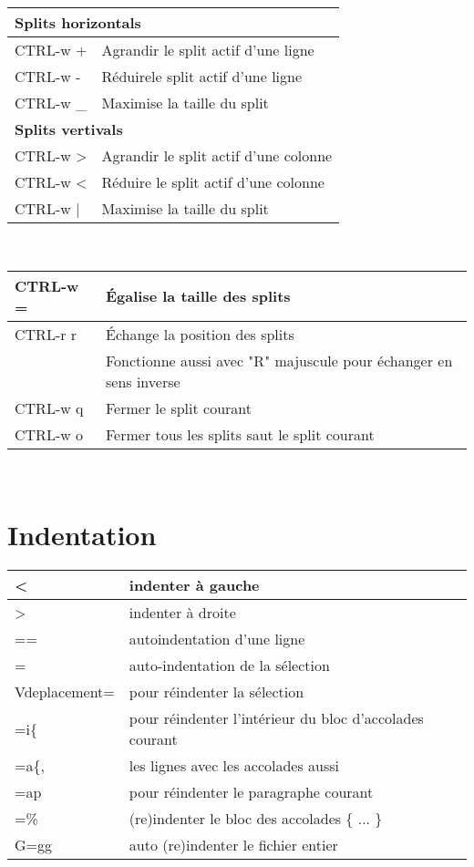 \documentclass{article}
\begin{document}
\begin{tabular}{|p{3cm}| l| }\hline
\multicolumn{2}{|l|}{\textbf{Splits horizontals}} \\ \hline
    CTRL-w + & Agrandir le split actif d'une ligne\\ \hline
    CTRL-w - & Réduirele split actif d'une ligne\\ \hline
    CTRL-w \_ & Maximise la taille du split\\ \hline
\multicolumn{2}{|l|}{\textbf{Splits vertivals}}\\ \hline
    CTRL-w > & Agrandir le split actif d'une colonne \\ \hline
    CTRL-w < & Réduire le split actif d'une colonne \\ \hline
    CTRL-w | & Maximise la taille du split\\ \hline
\end{tabular}\\[1.5em]


\begin{tabular}{|p{3cm}| l| }\hline
    CTRL-w = & Égalise la taille des splits \\ \hline
    CTRL-r r & Échange la position des splits\\
    & Fonctionne aussi avec "R" majuscule pour échanger en sens inverse \\ \hline
    CTRL-w q & Fermer le split courant \\ \hline
    CTRL-w o & Fermer tous les splits saut le split courant \\ \hline
\end{tabular}\\


\section{Indentation}
\begin{tabular}{|p{3cm}| l| }
\hline
< & indenter à gauche\\ \hline
> & indenter à droite\\ \hline
== & autoindentation d'une ligne\\ \hline
= & auto-indentation de la sélection\\ \hline
V{deplacement}= & pour réindenter la sélection\\ \hline
=i\{ & pour réindenter l'intérieur du bloc d'accolades courant\\ \hline
=a\{, & les lignes avec les accolades aussi\\ \hline
=ap & pour réindenter le paragraphe courant\\ \hline
=\% & (re)indenter le bloc des accolades \{ ... \} \\ \hline
G=gg   & auto (re)indenter le fichier entier \\ \hline
\end{tabular}\\
\end{document}
